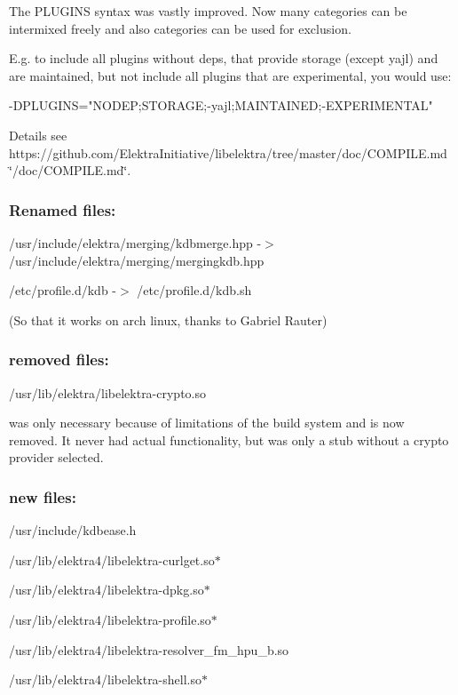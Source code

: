 The P\+L\+U\+G\+I\+N\+S syntax was vastly improved. Now many categories can be intermixed freely and also categories can be used for exclusion.

E.\+g. to include all plugins without deps, that provide storage (except yajl) and are maintained, but not include all plugins that are experimental, you would use\+: \begin{DoxyVerb}    -DPLUGINS="NODEP;STORAGE;-yajl;MAINTAINED;-EXPERIMENTAL"
\end{DoxyVerb}


Details see https\+://github.com/\+Elektra\+Initiative/libelektra/tree/master/doc/\+C\+O\+M\+P\+I\+L\+E.\+md \char`\"{}/doc/\+C\+O\+M\+P\+I\+L\+E.\+md\char`\"{}.

\subsubsection*{Renamed files\+:}

/usr/include/elektra/merging/kdbmerge.hpp -\/$>$ /usr/include/elektra/merging/mergingkdb.hpp

/etc/profile.d/kdb -\/$>$ /etc/profile.d/kdb.\+sh

(So that it works on arch linux, thanks to Gabriel Rauter)

\subsubsection*{removed files\+:}


\begin{DoxyItemize}
\item /usr/lib/elektra/libelektra-\/crypto.so
\end{DoxyItemize}

was only necessary because of limitations of the build system and is now removed. It never had actual functionality, but was only a stub without a crypto provider selected.

\subsubsection*{new files\+:}


\begin{DoxyItemize}
\item /usr/include/kdbease.h
\item /usr/lib/elektra4/libelektra-\/curlget.so$\ast$
\item /usr/lib/elektra4/libelektra-\/dpkg.so$\ast$
\item /usr/lib/elektra4/libelektra-\/profile.so$\ast$
\item /usr/lib/elektra4/libelektra-\/resolver\+\_\+fm\+\_\+hpu\+\_\+b.so
\item /usr/lib/elektra4/libelektra-\/shell.so$\ast$
\end{DoxyItemize}

